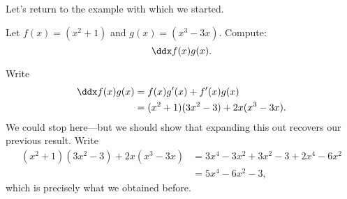 Let's return to the example with which we started.
\begin{example} 
Let $f(x)=(x^2+1)$ and $g(x)=(x^3-3x)$. Compute:
\[
\ddx f(x)g(x).
\]
\end{example}
\begin{solution}
Write
\begin{align*}
\ddx f(x)g(x) &= f(x)g'(x) + f'(x)g(x)\\
&=(x^2+1)(3x^2-3) + 2x(x^3-3x).
\end{align*}
We could stop here---but we should show that expanding this out recovers our previous result. Write
\begin{align*}
(x^2+1)(3x^2-3) + 2x(x^3-3x) &= 3x^4-3x^2 +3x^2 -3 + 2x^4-6x^2\\
&=5x^4-6x^2-3,
\end{align*}
which is precisely what we obtained before.
\end{solution}




